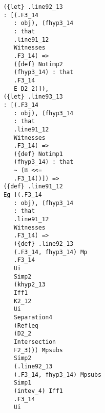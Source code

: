 \documentclass[12pt]{article}
\begin{document}
\begin{verbatim}
                                     ({let} .line92_13 
                                     : [(.F3_14 
                                        : obj), (fhyp3_14 
                                        : that 
                                        .line91_12 
                                        Witnesses 
                                        .F3_14) => 
                                        ({def} Notimp2 
                                        (fhyp3_14) : that 
                                        .F3_14 
                                        E D2_2)]), 
                                     ({let} .line93_13 
                                     : [(.F3_14 
                                        : obj), (fhyp3_14 
                                        : that 
                                        .line91_12 
                                        Witnesses 
                                        .F3_14) => 
                                        ({def} Notimp1 
                                        (fhyp3_14) : that 
                                        ~ (B <<= 
                                        .F3_14))]) => 
                                     ({def} .line91_12 
                                     Eg [(.F3_14 
                                        : obj), (fhyp3_14 
                                        : that 
                                        .line91_12 
                                        Witnesses 
                                        .F3_14) => 
                                        ({def} .line92_13 
                                        (.F3_14, fhyp3_14) Mp 
                                        .F3_14 
                                        Ui 
                                        Simp2 
                                        (khyp2_13 
                                        Iff1 
                                        K2_12 
                                        Ui 
                                        Separation4 
                                        (Refleq 
                                        (D2_2 
                                        Intersection 
                                        F2_3))) Mpsubs 
                                        Simp2 
                                        (.line92_13 
                                        (.F3_14, fhyp3_14) Mpsubs 
                                        Simp1 
                                        (intev_4) Iff1 
                                        .F3_14 
                                        Ui 

\end{verbatim}
\end{document}
